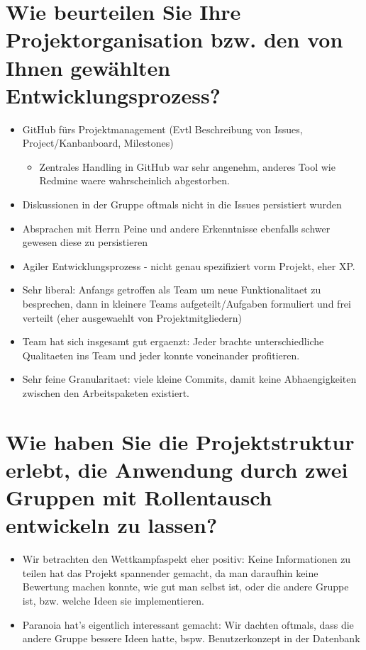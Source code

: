 \documentclass[12pt,DIV14,BCOR10mm,a4paper,parskip=half-,headsepline,headinclude,english,ngerman,bibliography=totocnumbered]{scrreprt}
\begin{document}
\section{Wie beurteilen Sie Ihre Projektorganisation bzw. den von Ihnen gewählten Entwicklungsprozess?}

\begin{itemize}
  \item GitHub fürs Projektmanagement (Evtl Beschreibung von Issues, Project/Kanbanboard, Milestones)
  \begin{itemize}
    \item Zentrales Handling in GitHub war sehr angenehm, anderes Tool wie Redmine waere wahrscheinlich abgestorben.
  \end{itemize}
  \item Diskussionen in der Gruppe oftmals nicht in die Issues persistiert wurden
  \item Absprachen mit Herrn Peine und andere Erkenntnisse ebenfalls schwer gewesen diese zu persistieren
  \item Agiler Entwicklungsprozess - nicht genau spezifiziert vorm Projekt, eher XP.
  \item Sehr liberal: Anfangs getroffen als Team um neue Funktionalitaet zu besprechen, dann in kleinere Teams aufgeteilt/Aufgaben formuliert und frei verteilt (eher ausgewaehlt von Projektmitgliedern)
  \item Team hat sich insgesamt gut ergaenzt: Jeder brachte unterschiedliche Qualitaeten ins Team und jeder konnte voneinander profitieren.
  \item Sehr feine Granularitaet: viele kleine Commits, damit keine Abhaengigkeiten zwischen den Arbeitspaketen existiert.
\end{itemize}




\section{Wie haben Sie die Projektstruktur erlebt, die Anwendung durch zwei Gruppen mit Rollentausch entwickeln zu lassen?}

\begin{itemize}
  \item Wir betrachten den Wettkampfaspekt eher positiv: Keine Informationen zu teilen hat das Projekt spannender gemacht, da man daraufhin keine Bewertung machen konnte, wie gut man selbst ist, oder die andere Gruppe ist, bzw. welche Ideen sie implementieren.
  \item Paranoia hat's eigentlich interessant gemacht: Wir dachten oftmals, dass die andere Gruppe bessere Ideen hatte, bspw. Benutzerkonzept in der Datenbank
\end{itemize}
\end{document}
